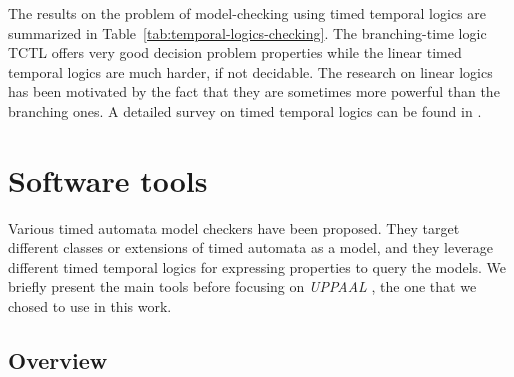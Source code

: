 The results on the problem of model-checking using timed temporal logics are summarized in Table~\ref{tab:temporal-logics-checking}. The branching-time logic TCTL offers very good decision problem properties while the linear timed temporal logics are much harder, if not decidable. The research on linear logics has been motivated by the fact that they are sometimes more powerful than the branching ones. A detailed survey on timed temporal logics can be found in \cite{Bouyer-M4M5}. \\


\section{Software tools}


Various timed automata model checkers have been proposed. They target different classes or extensions of timed automata as a model, and they leverage different timed temporal logics for expressing properties to query the models. We briefly present the main tools before focusing on \emph{UPPAAL} \cite{UPPAAL}, the one that we chosed to use in this work.\\


\subsection{Overview}


